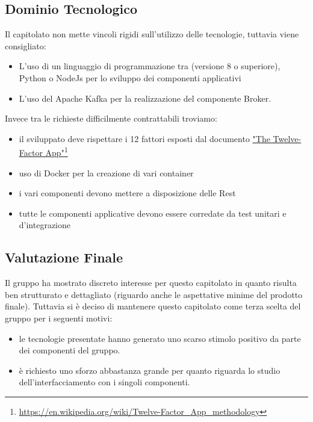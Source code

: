 \subsection{Dominio Tecnologico}
Il capitolato non mette vincoli rigidi sull'utilizzo delle tecnologie, tuttavia viene consigliato:
\begin{itemize}
 \item L'uso di un linguaggio di programmazione tra  (versione 8 o superiore), Python o NodeJs per lo sviluppo dei componenti applicativi
 \item L'uso del  Apache Kafka per la realizzazione del componente Broker.
\end{itemize}
Invece tra le richieste difficilmente contrattabili troviamo:
\begin{itemize} 
 \item il  sviluppato deve rispettare i 12 fattori esposti dal documento \href{https://en.wikipedia.org/wiki/Twelve-Factor_App_methodology}{"The Twelve-Factor App"}\footnote{\href{https://en.wikipedia.org/wiki/Twelve-Factor_App_methodology}{https://en.wikipedia.org/wiki/Twelve-Factor\_{}App\_{}methodology}}
 \item uso di Docker per la creazione di vari container
 \item i vari componenti devono mettere a disposizione delle  Rest
 \item tutte le componenti applicative devono essere corredate da test unitari e d'integrazione
\end{itemize}

\subsection{Valutazione Finale}
 Il gruppo ha mostrato discreto interesse per questo capitolato in quanto risulta ben strutturato e dettagliato (riguardo anche le aspettative minime del prodotto  finale).
 Tuttavia si è deciso di mantenere questo capitolato come terza scelta del gruppo per i seguenti motivi:
\begin{itemize}
  \item le tecnologie presentate hanno generato uno scarso stimolo positivo da parte dei componenti del gruppo.
  \item è richiesto uno sforzo abbastanza grande per quanto riguarda lo studio dell'interfacciamento con i singoli componenti.
\end{itemize}
